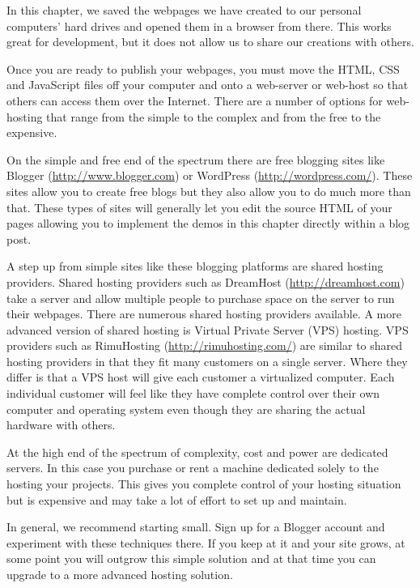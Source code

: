\documentclass[]{memoir}
\begin{document}
In this chapter, we saved the webpages we have created to our personal
computers' hard drives and opened them in a browser from there. This
works great for development, but it does not allow us to share our
creations with others.

Once you are ready to publish your webpages, you must move the HTML, CSS
and JavaScript files off your computer and onto a web-server or web-host
so that others can access them over the Internet. There are a number of
options for web-hosting that range from the simple to the complex and
from the free to the expensive.

On the simple and free end of the spectrum there are free blogging sites
like Blogger (\url{http://www.blogger.com}) or WordPress
(\url{http://wordpress.com/}). These sites allow you to create free
blogs but they also allow you to do much more than that. These types of
sites will generally let you edit the source HTML of your pages allowing
you to implement the demos in this chapter directly within a blog post.

A step up from simple sites like these blogging platforms are shared
hosting providers. Shared hosting providers such as DreamHost
(\url{http://dreamhost.com}) take a server and allow multiple people to
purchase space on the server to run their webpages. There are numerous
shared hosting providers available. A more advanced version of shared
hosting is Virtual Private Server (VPS) hosting. VPS providers such as
RimuHosting (\url{http://rimuhosting.com/}) are similar to shared
hosting providers in that they fit many customers on a single server.
Where they differ is that a VPS host will give each customer a
virtualized computer. Each individual customer will feel like they have
complete control over their own computer and operating system even
though they are sharing the actual hardware with others.

At the high end of the spectrum of complexity, cost and power are
dedicated servers. In this case you purchase or rent a machine dedicated
solely to the hosting your projects. This gives you complete control of
your hosting situation but is expensive and may take a lot of effort to
set up and maintain.

In general, we recommend starting small. Sign up for a Blogger account
and experiment with these techniques there. If you keep at it and your
site grows, at some point you will outgrow this simple solution and at
that time you can upgrade to a more advanced hosting solution.
\end{document}
